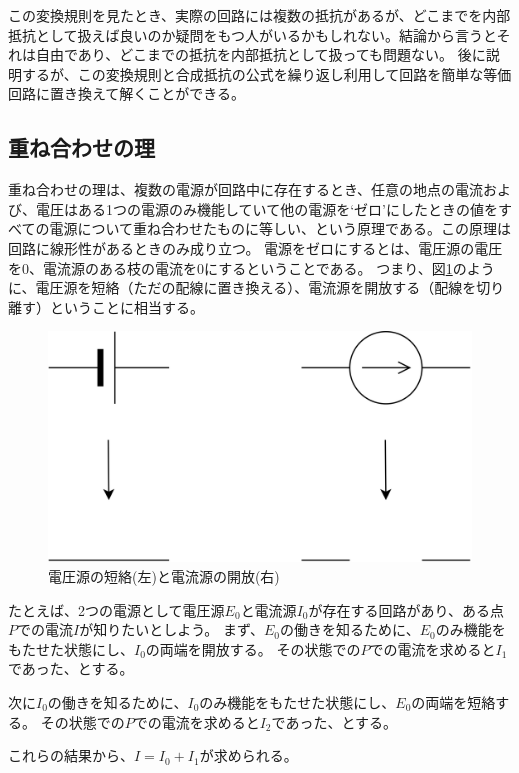 \documentclass{ltjsreport}
\begin{document}
この変換規則を見たとき、実際の回路には複数の抵抗があるが、どこまでを内部抵抗として扱えば良いのか疑問をもつ人がいるかもしれない。結論から言うとそれは自由であり、どこまでの抵抗を内部抵抗として扱っても問題ない。
後に説明するが、この変換規則と合成抵抗の公式を繰り返し利用して回路を簡単な等価回路に置き換えて解くことができる。

\subsection{重ね合わせの理}
重ね合わせの理は、複数の電源が回路中に存在するとき、任意の地点の電流および、電圧はある1つの電源のみ機能していて他の電源を`ゼロ'にしたときの値をすべての電源について重ね合わせたものに等しい、という原理である。この原理は回路に線形性があるときのみ成り立つ。
電源をゼロにするとは、電圧源の電圧を0、電流源のある枝の電流を0にするということである。
つまり、図\ref{fig:short_open}のように、電圧源を短絡（ただの配線に置き換える）、電流源を開放する（配線を切り離す）ということに相当する。

\begin{figure}[tbh]
  \centering
  \includegraphics[keepaspectratio, scale=0.07]
       {img/short_open.drawio.png}
  \caption{電圧源の短絡(左)と電流源の開放(右)}
  \label{fig:short_open}
 \end{figure}


たとえば、2つの電源として電圧源$E_0$と電流源$I_0$が存在する回路があり、ある点$P$での電流$I$が知りたいとしよう。
まず、$E_0$の働きを知るために、$E_0$のみ機能をもたせた状態にし、$I_0$の両端を開放する。
その状態での$P$での電流を求めると$I_1$であった、とする。

次に$I_0$の働きを知るために、$I_0$のみ機能をもたせた状態にし、$E_0$の両端を短絡する。
その状態での$P$での電流を求めると$I_2$であった、とする。

これらの結果から、$I=I_0+I_1$が求められる。
\end{document}
